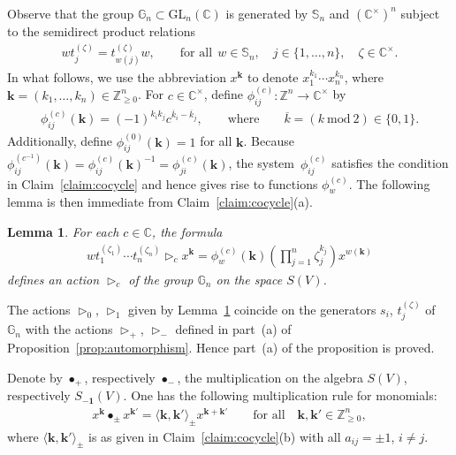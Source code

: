 \documentclass[11pt]{article}
\newtheorem{Lemma}[Theorem]{Lemma}
\begin{document}
Observe that the group $\mathbb G_n\subset \mathrm{GL}_n(\mathbb C)$ is generated by $\mathbb S_n$ and $(\mathbb
C^\times)^n$ subject to the semidirect product relations
\begin{gather*}
wt_j^{(\zeta)}=t_{w(j)}^{(\zeta)} w,
\qquad
\text{for all} \ \ w\in \mathbb S_n,
\quad
j\in\{1,\ldots,n\},
\quad
\zeta\in\mathbb C^\times.
\end{gather*}
In what follows, we use the abbreviation $x^{\mathbf k}$ to denote $x_1^{k_1}\cdots x_n^{k_n}$, where $\mathbf
k=(k_1,\ldots,k_n)\in \mathbb Z_{\ge 0}^n$.
For $c\in \mathbb C^\times$, def\/ine $\phi_{ij}^{(c)}\colon \mathbb Z^n\to \mathbb C^\times$ by
\begin{gather*}
\phi_{ij}^{(c)}(\mathbf k) = (-1)^{k_ik_j} c^{\overline k_i-\overline k_j},
\qquad
\text{where}
\qquad
\overline k=(k\ \mathrm{mod}\ 2)\in\{0,1\}.
\end{gather*}
Additionally, def\/ine $\phi_{ij}^{(0)}(\mathbf k)=1$ for all $\mathbf k$.
Because $\phi_{ij}^{(c^{-1})}(\mathbf k)=\phi_{ij}^{(c)}(\mathbf k)^{-1}=\phi_{ji}^{(c)}(\mathbf k)$, the system~$\phi_{ij}^{(c)}$ satisf\/ies the condition in Claim~\ref{claim:cocycle} and hence gives rise to functions
$\phi_w^{(c)}$.
The following lemma is then immediate from Claim~\ref{claim:cocycle}(a).

\begin{Lemma}
\label{lem:action}
For each $c\in\mathbb C$, the formula
\begin{gather*}
w t_1^{(\zeta_1)}\cdots t_n^{(\zeta_n)} \mathop{\triangleright}\nolimits_c x^{\mathbf k} = \phi^{(c)}_w(\mathbf k)
\left(\prod\limits_{j=1}^n \zeta_j^{k_j}\right) x^{w(\mathbf k)}
\end{gather*}
defines an action $\mathop{\triangleright}\nolimits_c$ of the group $\mathbb G_n$ on the space $S(V)$.
\end{Lemma}

The actions $\mathop{\triangleright}\nolimits_0$, $\mathop{\triangleright}\nolimits_1$ given by Lemma~\ref{lem:action}
coincide on the generators $s_i$, $t_j^{(\zeta)}$ of $\mathbb G_n$ with the actions
$\mathop{\triangleright}\nolimits_+$, $\mathop{\triangleright}\nolimits_-$ def\/ined in part~(a) of
Proposition~\ref{prop:automorphism}.
Hence part~(a) of the proposition is proved.



Denote by $\bullet_+$, respectively $\bullet_-$, the multiplication on the algebra $S(V)$, respectively
$S_{\mathbf{-1}}(V)$.
One has the following multiplication rule for monomials:
\begin{gather*}
x^{\mathbf k}\bullet_\pm x^{\mathbf{k'}} = \langle \mathbf k,\mathbf k'\rangle_\pm x^{\mathbf{k}+\mathbf{k'}}
\qquad
\text{for all}\quad\mathbf{k}, \mathbf{k'}\in \mathbb Z_{\ge 0}^n,
\end{gather*}
where $\langle \mathbf k,\mathbf k'\rangle_\pm$ is as given in Claim~\ref{claim:cocycle}(b) with all $a_{ij}=\pm1$, $i\ne j$.
\end{document}
